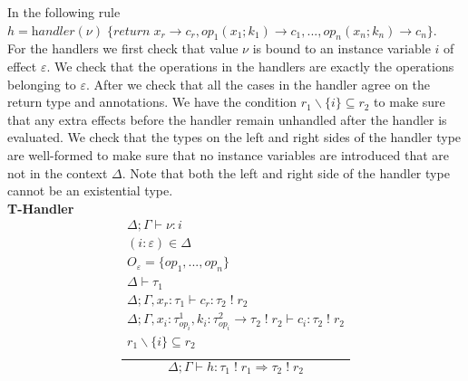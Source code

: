 \documentclass[12pt]{article}
\newcommand\eff[0]{\varepsilon}
\newcommand\Op[0]{O}
\newcommand\op[0]{op}
\newcommand\pty[1]{\ty^1_{#1}}
\newcommand\rty[1]{\ty^2_{#1}}
\newcommand\ty[0]{\tau}
\newcommand\tarr[2]{#1 \rightarrow #2}
\newcommand\thandler[2]{#1 \Rightarrow #2}
\newcommand\aty[2]{#1 \; ! \; #2}
\newcommand\val[0]{\nu}
\newcommand\vhandleri[2]{\textit{handler} ( #1 ) \; \{#2\}}
\newcommand\comp[0]{c}
\begin{document}
\vspace{10pt}
In the following rule \\$h = 
	\vhandleri{\val}{
		\textit{return} \; x_r \rightarrow \comp_r,
		\op_1(x_1 ; k_1) \rightarrow \comp_1,
		...,
		\op_n(x_n ; k_n) \rightarrow \comp_n
	}$.\\
For the handlers we first check that value $\val$ is bound to an instance variable $i$ of effect $\eff$.
We check that the operations in the handlers are exactly the operations belonging to $\eff$.
After we check that all the cases in the handler agree on the return type and annotations.
We have the condition $r_1 \backslash \{ i \} \subseteq r_2$ to make sure that any extra effects before the handler remain unhandled after the handler is evaluated.
We check that the types on the left and right sides of the handler type are well-formed to make sure that no instance variables are introduced that are not in the context $\Delta$. Note that both the left and right side of the handler type cannot be an existential type.
\\\textbf{T-Handler}
\[\frac{
	\begin{array}{l}
	\Delta;\Gamma \vdash \val : i \\
	(i:\eff)\in\Delta \\
	\Op_\eff = \{ op_1, ..., op_n \} \\
	\Delta \vdash \ty_1 \\
	\Delta;\Gamma, x_r : \ty_1 \vdash \comp_r : \aty{\ty_2}{r_2} \\
	\Delta;\Gamma, x_i : \pty{\op_i}, k_i : \tarr{\rty{\op_i}}{\aty{\ty_2}{r_2}} \vdash \comp_i : \aty{\ty_2}{r_2} \\
	r_1 \backslash \{ i \} \subseteq r_2 \\
	\end{array}
}{
	\Delta;\Gamma \vdash h :
	\thandler{\aty{\ty_1}{r_1}}{\aty{\ty_2}{r_2}}
}\]
\end{document}
